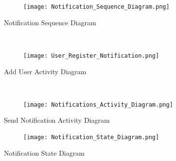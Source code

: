 \documentclass{article}
\begin{document}
\begin{figure}[h!]
  \texttt{[image: Notification\_Sequence\_Diagram.png]}
\end{figure}
Notification Sequence Diagram

\mbox{}\\
\bigskip


\begin{figure}[h!]
  \texttt{[image: User\_Register\_Notification.png]}
\end{figure}
Add User Activity Diagram

\mbox{}\\
\bigskip

\begin{figure}[h!]
  \texttt{[image: Notifications\_Activity\_Diagram.png]}
\end{figure}
Send Notification Activity Diagram

\begin{figure}[h!]
  \texttt{[image: Notification\_State\_Diagram.png]}
\end{figure}
Notification State Diagram

\mbox{}\\
\end{document}
